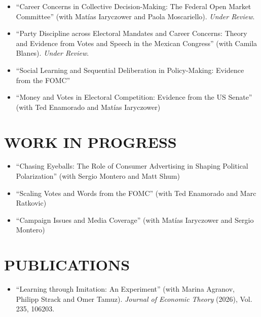 \documentclass[margin, 10pt]{res} %
\begin{document}
\begin{resume}
\begin{itemize}
\item[-] ``Career Concerns in Collective Decision-Making: The Federal
  Open Market Committee'' (with Mat\'{i}as Iaryczower and Paola
  Moscariello). \emph{Under Review}.\\
\item[-] ``Party Discipline across Electoral Mandates and Career
  Concerns: Theory and Evidence from Votes and Speech in the Mexican
  Congress'' (with Camila Blanes). \emph{Under Review}.\\
\item[-] ``Social Learning and Sequential Deliberation in
  Policy-Making: Evidence from the FOMC''\\
\item[-] ``Money and Votes in Electoral Competition: Evidence
  from the US Senate'' (with Ted Enamorado and Mat\'{i}as Iaryczower)\\
\end{itemize}
       \section{WORK IN PROGRESS}
\begin{itemize} \itemsep -2pt

       \item[-] ``Chasing Eyeballs: The Role of Consumer Advertising
         in Shaping Political Polarization'' (with Sergio Montero and
         Matt Shum)\\
       \item[-] ``Scaling Votes and Words from the FOMC'' (with Ted Enamorado and Marc
            Ratkovic)
             \item[-] ``Campaign Issues and Media Coverage'' (with Mat\'{i}as
    Iaryczower and Sergio Montero)\\
\end{itemize}

\section{PUBLICATIONS}
\begin{itemize} \itemsep -2pt
\item[-] ``Learning through Imitation: An Experiment'' (with
  Marina Agranov, Philipp Strack and Omer Tamuz). \emph{Journal of
  Economic Theory} (2026), Vol. 235, 106203.\\


\end{itemize}
\end{resume}
\end{document}
